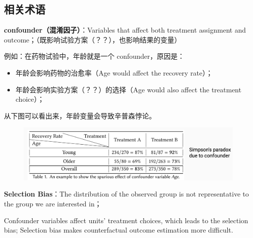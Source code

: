 \documentclass[12pt]{article}
\begin{document}
\subsection{相关术语\cite{AAAI_2020_Tutorial_Representation_Learning_for_Causal_Inference}}
\textbf{confounder（混淆因子）}：Variables that affect both treatment assignment and outcome；（既影响试验方案（？？），也影响结果的变量）

例如：在药物试验中，年龄就是一个 confounder，原因是：
\begin{itemize}
\setlength{\itemsep}{0pt}
\setlength{\parsep}{0pt}
\setlength{\parskip}{0pt}
    \item 年龄会影响药物的治愈率（Age would affect the recovery rate）；
    \item 年龄会影响实验方案（？？）的选择（Age would also affect the treatment choice）；
\end{itemize}

从下图可以看出来，年龄变量会导致辛普森悖论。
\begin{figure}[H]
    \centering
    \includegraphics[width=1\textwidth]{fig/CasualInference-Confounder-Example-In-Medicine.png}
\end{figure}

\textbf{Selection Bias}：The distribution of the observed group is not representative to the group we are interested in；

Confounder variables affect units' treatment choices, which leads to the
selection bias; Selection bias makes counterfactual outcome estimation more diﬃcult.
\end{document}
